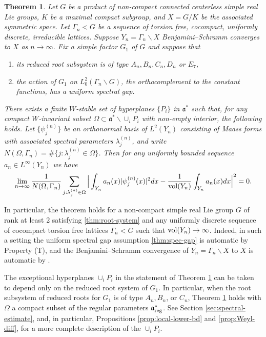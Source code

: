 \documentclass[12pt]{amsart}
\newtheorem{theorem}{Theorem}[section]
\theoremstyle{remark}
\newcommand{\ga}{\mathfrak a}
\begin{document}
\begin{theorem}\label{main-theorem}
Let $G$ be a product of non-compact connected centerless simple real Lie groups, $K$ be a maximal compact subgroup, and $X = G/K$ be the associated symmetric space. Let $\Gamma_n<G$ be a sequence of torsion free, cocompact, uniformly discrete, irreducible lattices. Suppose  $Y_n = \Gamma_n \backslash X$ Benjamini--Schramm converges to $X$ as $n \to \infty$. Fix a simple factor $G_1$ of $G$ and suppose that 
\begin{enumerate}
\item\label{thm:root-system} its reduced root subsystem is of type $A_n, B_n, C_n, D_n$ or $E_7$,
\item\label{thm:spec-gap} the action of $G_1$ on $L^2_0(\Gamma_n\backslash G)$, the orthocomplement to the constant functions, has a uniform spectral gap. 
\end{enumerate}

There exists a finite $W$-stable set of hyperplanes $\{ P_i\}$ in $\ga^*$ such that, for any compact $W$-invariant subset $\Omega \subset \mathfrak{a}^*\smallsetminus\cup_i P_i$ with non-empty interior, the following holds. Let $\{\psi_j^{(n)}\}$ be an orthonormal basis of $L^2(Y_n)$ consisting of Maass forms with associated spectral parameters $\lambda_j^{(n)}$, and write $N(\Omega, \Gamma_n) = \#\{j : \lambda_j^{(n)} \in \Omega \}$. Then for any uniformly bounded sequence $a_n\in L^\infty(Y_n)$ we have
    \begin{gather*}
       \lim_{n\rightarrow\infty} \frac{1}{N(\Omega, \Gamma_n)} \sum_{j: \lambda_j^{(n)} \in \Omega} \Big| \int_{Y_n} a_n(x) |\psi_j^{(n)}(x)|^2 dx - \frac{1}{{\rm vol}(Y_n)}\int_{Y_n} a_n(x) dx \Big|^2 = 0.
    \end{gather*}
\end{theorem}

In particular, the theorem holds for a non-compact simple real Lie group $G$ of rank at least 2 satisfying \eqref{thm:root-system} and any uniformly discrete sequence of cocompact torsion free lattices $\Gamma_n<G$  such that ${\rm vol}(Y_n)\rightarrow\infty$. Indeed, in such a setting the uniform spectral gap assumption \eqref{thm:spec-gap} is automatic by Property (T), and the Benjamini--Schramm convergence of $Y_n=\Gamma_n\backslash X$ to $X$ is automatic by \cite[Theorem 1.5]{7_samurai}.

The exceptional hyperplanes $\cup_i P_i$ in the statement of Theorem \ref{main-theorem} can be taken to depend only on the reduced root system of $G_1$. In particular, when the root subsystem of reduced roots for $G_1$ is of type $A_n, B_n$, or $C_n$, Theorem \ref{main-theorem} holds with $\Omega$ a compact subset of the regular parameters $\ga^*_{\rm reg}$. See Section \ref{sec:spectral-estimate}, and, in particular, Propositions \ref{prop:local-lower-bd} and \ref{prop:Weyl-diff}, for a more complete description of the $\cup_i P_i$.
\end{document}
